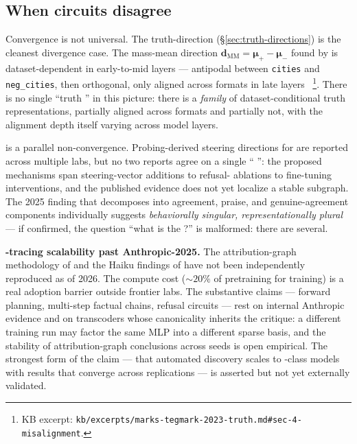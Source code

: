 \subsection{When circuits disagree}
\label{sec:circuit-disagreement}

Convergence is not universal. The truth-direction 
(\S\ref{sec:truth-directions}) is the cleanest divergence case. The
mass-mean direction $\mathbf{d}_{\mathrm{MM}} = \boldsymbol{\mu}_+ -
\boldsymbol{\mu}_-$ found by \citet{marks-tegmark-2023-truth} is
dataset-dependent in early-to-mid layers --- antipodal between
\texttt{cities} and \texttt{neg\_cities}, then orthogonal, only aligned
across formats in late layers~\citep[\S 4]{marks-tegmark-2023-truth}%
\footnote{KB excerpt:
\nolinkurl{kb/excerpts/marks-tegmark-2023-truth.md#sec-4-misalignment}.}.
There is no single ``truth '' in this picture: there is a
\emph{family} of dataset-conditional truth representations, partially
aligned across formats and partially not, with the alignment depth
itself varying across model layers.

 is a parallel non-convergence. Probing-derived steering
directions for  are reported across multiple labs, but no
two reports agree on a single `` '': the proposed
mechanisms span steering-vector additions to refusal-
ablations to fine-tuning interventions, and the published evidence
does not yet localize a stable subgraph. The 2025 finding that
 decomposes into agreement, praise, and genuine-agreement %
components individually suggests \emph{behaviorally singular,
representationally plural} --- if confirmed, the question ``what is
the  ?'' is malformed: there are several.

\begin{contradiction}
\textbf{-tracing scalability past Anthropic-2025.} The
attribution-graph methodology of \citet{lindsey2025-circuit-tracing}
and the Haiku findings of \citet{lindsey2025-biology} have not been
independently reproduced as of 2026. The compute cost
($\sim\!20\%$ of pretraining for  training) is a real
adoption barrier outside frontier labs. The substantive claims
--- forward planning, multi-step factual chains, refusal circuits ---
rest on internal Anthropic evidence and on transcoders whose
canonicality inherits the \citet{leask2025-sae-not-canonical}
critique: a different  training run may factor the same MLP
into a different sparse basis, and the stability of attribution-graph
conclusions across  seeds is open empirical. The strongest
form of the claim --- that automated  discovery scales to
-class models with results that converge across replications
--- is asserted but not yet externally validated.
\end{contradiction}

